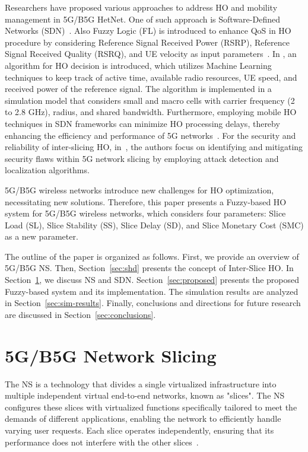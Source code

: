 \documentclass[graybox]{svmult}
\begin{document}
Researchers have proposed various approaches to address HO and mobility management in 5G/B5G HetNet. One of such approach is Software-Defined Networks (SDN)~\cite{7108393}. Also Fuzzy Logic (FL) is introduced to enhance QoS in HO procedure by considering Reference Signal Received Power (RSRP), Reference Signal Received Quality (RSRQ), and UE velocity as input parameters~\cite{alraih2022robust}. In \cite{khan2021improved}, an algorithm for HO decision is introduced, which utilizes Machine Learning techniques to keep track of active time, available radio resources, UE speed, and received power of the reference signal. The algorithm is implemented in a simulation model that considers small and macro cells with carrier frequency (2 to 2.8 GHz), radius, and shared bandwidth. Furthermore, employing mobile HO techniques in SDN frameworks can minimize HO processing delays, thereby enhancing the efficiency and performance of 5G networks~\cite{8587956,7993880,8748678}. For the security and reliability of inter-slicing HO, in~\cite{10060402}, the authors focus on identifying and mitigating security flaws within 5G network slicing by employing attack detection and localization algorithms. 

5G/B5G wireless networks introduce new challenges for HO optimization, necessitating new solutions. Therefore, this paper presents a Fuzzy-based HO system for 5G/B5G wireless networks, which considers four parameters: Slice Load (SL), Slice Stability (SS), Slice Delay (SD), and Slice Monetary Cost (SMC) as a new parameter.
 
The outline of the paper is organized as follows. First, we provide an overview of 5G/B5G NS. Then, Section~\ref{sec:shd} presents the concept of Inter-Slice HO. In Section~\ref{sec:nssdn}, we discuss NS and SDN. Section~\ref{sec:proposed} presents the proposed Fuzzy-based system and its implementation. The simulation results are analyzed in Section~\ref{sec:sim-results}. Finally, conclusions and directions for future research are discussed in Section~\ref{sec:conclusions}.


\section{5G/B5G Network Slicing}\label{sec:nssdn}
The NS is a technology that divides a single virtualized infrastructure into multiple independent virtual end-to-end networks, known as "slices". The NS configures these slices with virtualized functions specifically tailored to meet the demands of different applications, enabling the network to efficiently handle varying user requests. Each slice operates independently, ensuring that its performance does not interfere with the other slices~\cite{Namwon2019,jiang2016network,8858288}. 
\end{document}
